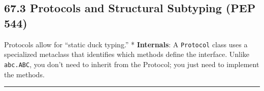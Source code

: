 \hypertarget{protocols-and-structural-subtyping-pep-544}{%
\subsection{67.3 Protocols and Structural Subtyping (PEP
544)}\label{protocols-and-structural-subtyping-pep-544}}

Protocols allow for ``static duck typing.'' * \textbf{Internals}: A
\passthrough{\lstinline!Protocol!} class uses a specialized metaclass
that identifies which methods define the interface. Unlike
\passthrough{\lstinline!abc.ABC!}, you don't need to inherit from the
Protocol; you just need to implement the methods.

\begin{center}\rule{0.5\linewidth}{0.5pt}\end{center}
